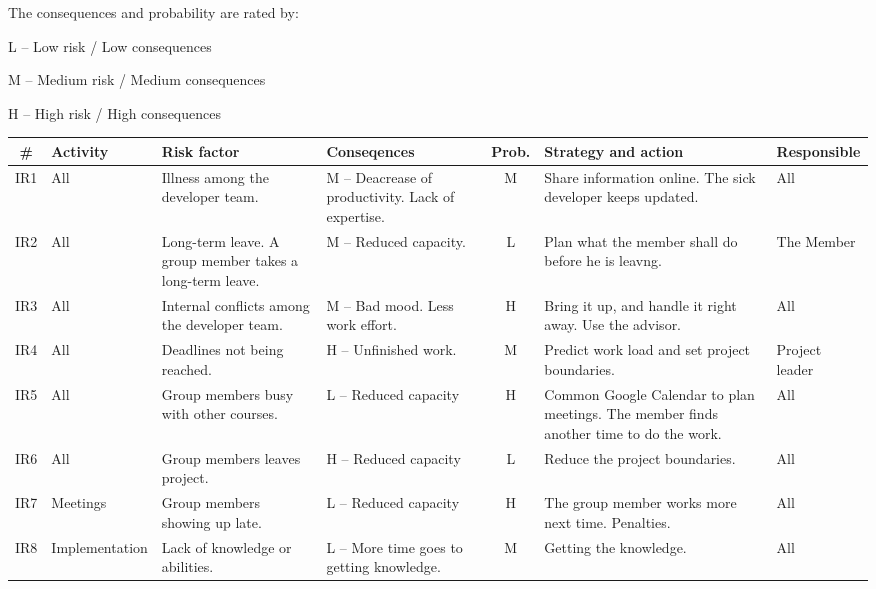 \documentclass[]{article}
\begin{document}
The consequences and probability are rated by:

L -- Low risk / Low consequences

M -- Medium risk / Medium consequences

H -- High risk / High consequences \\

\begin{tabular}{  c 	 	l 	 	p{4.0cm} 	 	p{4.0cm} 	  	c 	 	p{4.0cm} 	 	l }
\hline
  \# & Activity 	& Risk factor 	& Conseqences 	& Prob.& Strategy and action 							& Responsible \\
\hline
  IR1 & All		& Illness among the developer team.  	& M -- Deacrease of productivity. Lack of expertise.	& M 	& Share information online. The sick developer keeps updated. 	& All \\
\hline
  IR2 & All		& Long-term leave. A group member takes a long-term leave.  & M -- Reduced capacity.  & L	&  Plan what the member shall do before he is leavng.		& The Member \\
\hline
  IR3 & All		& Internal conflicts among the developer team.		& M -- Bad mood. Less work effort.  & H	&  Bring it up, and handle it right away. Use the advisor. 		& All \\
\hline
  IR4 & All		& Deadlines not being reached.			 	& H -- Unfinished work.  & M	&  Predict work load and set project boundaries. 	& Project leader \\
\hline
  IR5 & All		& Group members busy with other courses.		 & L -- Reduced capacity & H	&  Common Google Calendar to plan meetings. The member finds another time to do the work. 	& All \\
\hline
  IR6 & All		& Group members leaves project.		 	& H -- Reduced capacity & L	&  Reduce the project boundaries.	& All \\
\hline
  IR7 & Meetings		& Group members showing up late.	 	& L -- Reduced capacity & H	&  The group member works more next time. Penalties. 	& All \\
\hline
  IR8 & Implementation		& Lack of knowledge or abilities.	 	& L -- More time goes to getting knowledge. & M & Getting the knowledge. 	& All \\
\end{tabular}

\newpage{}
\end{document}
